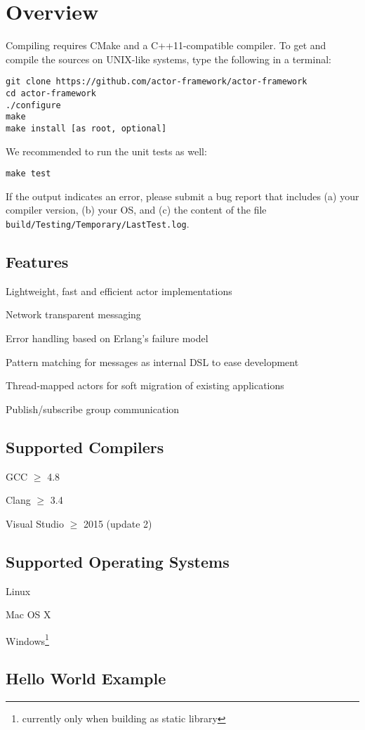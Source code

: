 \section{Overview}

Compiling \lib requires CMake and a C++11-compatible compiler. To get and compile the sources on UNIX-like systems, type the following in a terminal:

\begin{verbatim}
git clone https://github.com/actor-framework/actor-framework
cd actor-framework
./configure
make
make install [as root, optional]
\end{verbatim}

We recommended to run the unit tests as well:

\begin{verbatim}
make test
\end{verbatim}

If the output indicates an error, please submit a bug report that includes (a) your compiler version, (b) your OS, and (c) the content of the file \texttt{build/Testing/Temporary/LastTest.log}.

\subsection{Features}

\begin{itemize*}
  \item Lightweight, fast and efficient actor implementations
  \item Network transparent messaging
  \item Error handling based on Erlang's failure model
  \item Pattern matching for messages as internal DSL to ease development
  \item Thread-mapped actors for soft migration of existing applications
  \item Publish/subscribe group communication
\end{itemize*}


\subsection{Supported Compilers}

\begin{itemize*}
  \item GCC $\ge$ 4.8
  \item Clang $\ge$ 3.4
  \item Visual Studio $\ge$ 2015 (update 2)
\end{itemize*}

\subsection{Supported Operating Systems}

\begin{itemize*}
\item Linux
\item Mac OS X
\item Windows\footnote{currently only when building \lib as static library}
\end{itemize*}

\clearpage
\subsection{Hello World Example}


